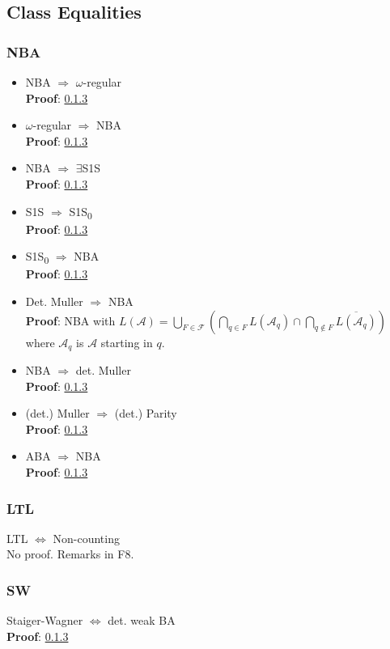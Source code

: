 \documentclass{article}
\begin{document}
\subsection{Class Equalities}
\subsubsection{NBA}
\begin{itemize}
	\item NBA $\Rightarrow$ $\omega$-regular \\
    	\textbf{Proof}: \ref{} %
	\item $\omega$-regular $\Rightarrow$ NBA \\
    	\textbf{Proof}: \ref{} %
    \item NBA $\Rightarrow$ $\exists$S1S \\
    	\textbf{Proof}: \ref{} %
    \item S1S $\Rightarrow$ S1S\textsubscript{0} \\
    	\textbf{Proof}: \ref{} %
    \item S1S\textsubscript{0} $\Rightarrow$ NBA \\
    	\textbf{Proof}: \ref{} %
    \item Det. Muller $\Rightarrow$ NBA \\
    	\textbf{Proof}: NBA with $L(\mathcal{A}) = \bigcup\limits_{F \in \mathcal{F}} \left( \bigcap\limits_{q \in F} L(\mathcal{A}_q) \cap \bigcap\limits_{q \notin F} \overline{L(\mathcal{A}_q)} \right)$ where $\mathcal{A}_q$ is $\mathcal{A}$ starting in $q$.
    \item NBA $\Rightarrow$ det. Muller \\
    	\textbf{Proof}: \ref{} %
   	\item (det.) Muller $\Rightarrow$ (det.) Parity \\
   		\textbf{Proof}: \ref{} %
   	\item ABA $\Rightarrow$ NBA \\
   		\textbf{Proof}: \ref{} %
\end{itemize}

\subsubsection{LTL}
LTL $\Leftrightarrow$ Non-counting \\
No proof. Remarks in F8.

\subsubsection{SW}
Staiger-Wagner $\Leftrightarrow$ det. weak BA \\
\textbf{Proof}: \ref{} %
\end{document}

